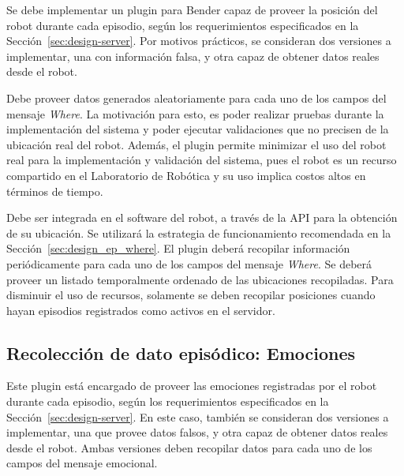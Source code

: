 Se debe implementar un plugin para Bender capaz de proveer la posición del robot durante cada episodio, según los requerimientos especificados en la Sección~\ref{sec:design-server}. Por motivos prácticos, se consideran dos versiones a implementar, una con información falsa, y otra capaz de obtener datos reales desde el robot.

Debe proveer datos generados aleatoriamente para cada uno de los campos del mensaje \textit{Where}. La motivación para esto, es poder realizar pruebas durante la implementación del sistema y poder ejecutar validaciones que no precisen de la ubicación real del robot. Además, el plugin permite minimizar el uso del robot real para la implementación y validación del sistema, pues el robot es un recurso compartido en el Laboratorio de Robótica y su uso implica costos altos en términos de tiempo.

Debe ser integrada en el software del robot, a través de la API para la obtención de su ubicación. Se utilizará la estrategia de funcionamiento recomendada en la Sección~\ref{sec:design_ep_where}. El plugin deberá recopilar información periódicamente para cada uno de los campos del mensaje \textit{Where}. Se deberá proveer un listado temporalmente ordenado de las ubicaciones recopiladas. Para disminuir el uso de recursos, solamente se deben recopilar posiciones cuando hayan episodios registrados como activos en el servidor.


\subsection{Recolección de dato episódico: Emociones}

Este plugin está encargado de proveer las emociones registradas por el robot durante cada episodio, según los requerimientos especificados en la Sección~\ref{sec:design-server}. En este caso, también se consideran dos versiones a implementar, una que provee datos falsos, y otra capaz de obtener datos reales desde el robot. Ambas versiones deben recopilar datos para cada uno de los campos del mensaje emocional.

